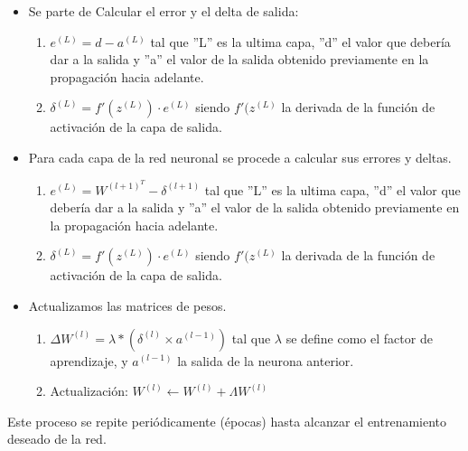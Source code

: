 \begin{itemize}
    \item Se parte de Calcular el error y el delta de salida:
    \begin{enumerate}
        \item $e^{(L)} = d - a^{(L)}$ tal que ''L'' es la ultima capa, ''d'' el valor que debería dar a la salida y ''a'' el valor de la salida obtenido previamente en la propagación hacia adelante.
        \item $ \delta ^{(L)} = f'(z^{(L)}) \cdot e^{(L)}$ siendo $f'(z^{(L)}$ la derivada de la función de activación de la capa de salida.
    \end{enumerate}
    \item Para cada capa de la red neuronal se procede a calcular sus errores y deltas.
    \begin{enumerate}
        \item $e^{(L)} = W^{(l+1)^T} - \delta ^{(l+1)}$ tal que ''L'' es la ultima capa, ''d'' el valor que debería dar a la salida y ''a'' el valor de la salida obtenido previamente en la propagación hacia adelante.
        \item $ \delta ^{(L)} = f'(z^{(L)}) \cdot e^{(L)}$ siendo $f'(z^{(L)}$ la derivada de la función de activación de la capa de salida.
    \end{enumerate}
    \item Actualizamos las matrices de pesos.
    \begin{enumerate}
        \item $\Delta W^{(l)} = \lambda * (\delta^{(l)} \times a^{(l-1)} )$ tal que $\lambda$ se define como el factor de aprendizaje, y $a^{(l-1)}$ la salida de la neurona anterior.
        \item Actualización: $ W^{(l)} \leftarrow W^{(l)} + \Lambda W^{(l)} $
    \end{enumerate}
\end{itemize}

Este proceso se repite periódicamente (épocas) hasta alcanzar el entrenamiento deseado de la red.\par
